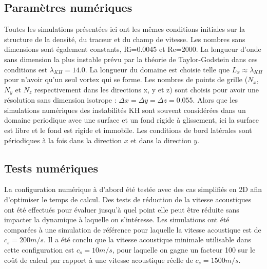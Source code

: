 \documentclass[a4paper,12pt]{article}
\begin{document}
    \subsection{Paramètres numériques}
    
    
    Toutes les simulations présentées ici ont les mêmes conditions initiales sur la structure de la densité, du traceur et du champ de vitesse. Les nombres sans dimensions sont également constants, Ri=0.0045 et Re=2000. La longueur d'onde sans dimension la plus instable prévu par la théorie de Taylor-Godstein dans ces conditions est $\lambda_{KH}=14.0$. La longueur du domaine est choisie telle que $L_x\approx \lambda_{KH}$ pour n'avoir qu'un seul vortex qui se forme. Les nombres de points de grille ($N_x$, $N_y$ et $N_z$ respectivement dans les directions x, y et z) sont choisis pour avoir une résolution sans dimension isotrope : $\Delta x=\Delta y=\Delta z=0.055$. Alors que les simulations numériques des instabilités KH sont souvent considérées dans un domaine periodique avec une surface et un fond rigide à glissement, ici la surface est libre et le fond est rigide et immobile. Les conditions de bord latérales sont périodiques à la fois dans la direction $x$ et dans la direction $y$. 
    
    \subsection{Tests numériques}
    
    La configuration numérique à d'abord été testée avec des cas simplifiés en 2D afin d'optimiser le temps de calcul. Des tests de réduction de la vitesse acoustiques ont été effectués pour évaluer jusqu'à quel point elle peut être réduite sans impacter la dynamique à laquelle on s'intéresse. Les simulations ont été comparées à une simulation de référence pour laquelle la vitesse acoustique est de $c_s=200 m/s$. Il a été conclu que la vitesse acoustique minimale utilisable dans cette configuration est $c_s=10 m/s$, pour laquelle on gagne un facteur 100 sur le coût de calcul par rapport à une vitesse acoustique réelle de $c_s= 1500 m/s$.
   
\end{document}
